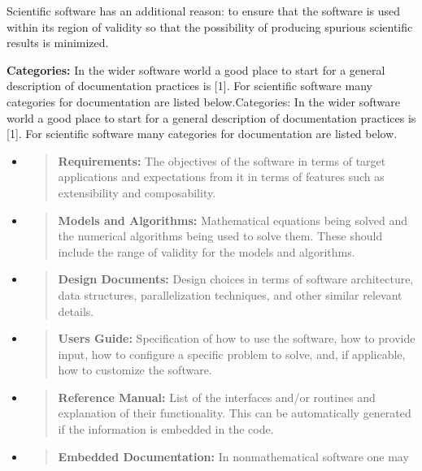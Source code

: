 \documentclass[]{article}
\begin{document}
Scientific software has an additional reason: to ensure that the
software is used within its region of validity so that the possibility
of producing spurious scientific results is minimized.

\textbf{Categories:} In the wider
software world a good place to start for a general description of
documentation practices is {[}1{]}. For scientific software many
categories for documentation are listed
below.{Categories: In the wider software world a good place to start for a general description of documentation practices is {[}1{]}. For scientific software many categories for documentation are listed below.}

\begin{itemize}
\item
  \begin{quote}
  \textbf{Requirements:} The objectives of the software in terms of
  target applications and expectations from it in terms of features such
  as extensibility and composability.
  \end{quote}
\item
  \begin{quote}
  \textbf{Models and Algorithms:} Mathematical equations being solved
  and the numerical algorithms being used to solve them. These should
  include the range of validity for the models and algorithms.
  \end{quote}
\item
  \begin{quote}
  \textbf{Design Documents:} Design choices in terms of software
  architecture, data structures, parallelization techniques, and other
  similar relevant details.
  \end{quote}
\item
  \begin{quote}
  \textbf{Users Guide:} Specification of how to use the software, how to
  provide input, how to configure a specific problem to solve, and, if
  applicable, how to customize the software.
  \end{quote}
\item
  \begin{quote}
  \textbf{Reference Manual:} List of the interfaces and/or routines and
  explanation of their functionality. This can be automatically
  generated if the information is embedded in the code.
  \end{quote}
\item
  \begin{quote}
  \textbf{Embedded Documentation:} In nonmathematical software one may

\end{quote}
\end{itemize}
\end{document}
